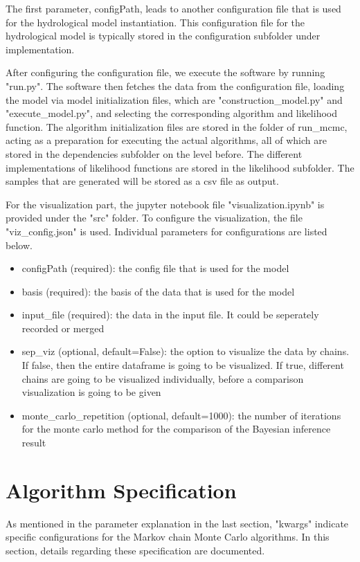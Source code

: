 The first parameter, configPath, leads to another configuration file that is used for the hydrological model instantiation. This configuration file for the hydrological model is typically stored in the configuration subfolder under implementation.

After configuring the configuration file, we execute the software by running "run.py". The software then fetches the data from the configuration file, loading the model via model initialization files, which are "construction\_model.py" and "execute\_model.py", and selecting the corresponding algorithm and likelihood function. The algorithm initialization files are stored in the folder of run\_mcmc, acting as a preparation for executing the actual algorithms, all of which are stored in the dependencies subfolder on the level before. The different implementations of likelihood functions are stored in the likelihood subfolder. The samples that are generated will be stored as a csv file as output.

For the visualization part, the jupyter notebook file "visualization.ipynb" is provided under the "src" folder. To configure the visualization, the file "viz\_config.json" is used. Individual parameters for configurations are listed below.

\begin{itemize}
    \item configPath (required): the config file that is used for the model
    \item basis (required): the basis of the data that is used for the model
    \item input\_file (required): the data in the input file. It could be seperately recorded or merged
    \item sep\_viz (optional, default=False): the option to visualize the data by chains. If false, then the entire dataframe is going to be visualized. If true, different chains are going to be visualized individually, before a comparison visualization is going to be given
    \item monte\_carlo\_repetition (optional, default=1000): the number of iterations for the monte carlo method for the comparison of the Bayesian inference result 
\end{itemize}

\section{Algorithm Specification}
As mentioned in the parameter explanation in the last section, "kwargs" indicate specific configurations for the Markov chain Monte Carlo algorithms. In this section, details regarding these specification are documented.

